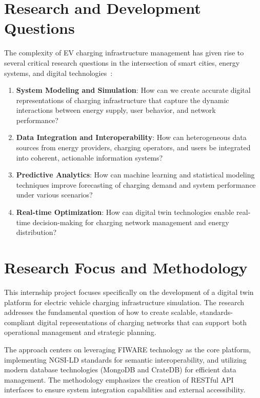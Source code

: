\section{Research and Development Questions}

The complexity of EV charging infrastructure management has given rise to several critical research questions in the intersection of smart cities, energy systems, and digital technologies~\cite{grieves2014digital,rasheed2020digital}:

\begin{enumerate}
    \item \textbf{System Modeling and Simulation}: How can we create accurate digital representations of charging infrastructure that capture the dynamic interactions between energy supply, user behavior, and network performance?~\cite{zhang2021digital}
    
    \item \textbf{Data Integration and Interoperability}: How can heterogeneous data sources from energy providers, charging operators, and users be integrated into coherent, actionable information systems?~\cite{fiware2023ngsi}
    
    \item \textbf{Predictive Analytics}: How can machine learning and statistical modeling techniques improve forecasting of charging demand and system performance under various scenarios?~\cite{ahmad2018optimal}
    
    \item \textbf{Real-time Optimization}: How can digital twin technologies enable real-time decision-making for charging network management and energy distribution?~\cite{tao2019digital}
\end{enumerate}

\section{Research Focus and Methodology}

This internship project focuses specifically on the development of a digital twin platform for electric vehicle charging infrastructure simulation. The research addresses the fundamental question of how to create scalable, standards-compliant digital representations of charging networks that can support both operational management and strategic planning.

The approach centers on leveraging FIWARE technology as the core platform, implementing NGSI-LD standards for semantic interoperability, and utilizing modern database technologies (MongoDB and CrateDB) for efficient data management. The methodology emphasizes the creation of RESTful API interfaces to ensure system integration capabilities and external accessibility.

